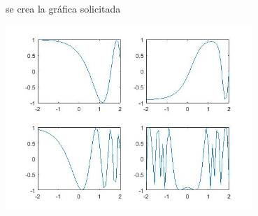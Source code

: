 \documentclass[11pt]{article}
\begin{document}
\begin{enumerate}
se crea la gr\'afica solicitada
\begin{center}
\includegraphics[width=0.7\textwidth]{funciones.jpg} 
\fbox{10 pt}
\end{center}

\end{enumerate}
\end{document}
